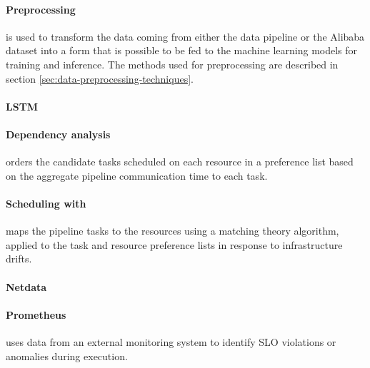       \paragraph{Preprocessing} is used to transform the data coming from either the data pipeline or the Alibaba dataset into a form that is possible to be fed to the machine learning models for training and inference. The methods used for preprocessing are described in section \ref{sec:data-preprocessing-techniques}.

      \paragraph{LSTM}

      \paragraph{Dependency analysis} orders the candidate tasks scheduled on each resource in a preference list based on the aggregate pipeline communication time to each task.
      
      
      \paragraph{Scheduling with \CMATCH } maps the pipeline tasks to the resources using a matching theory algorithm, applied to the task and resource preference lists in response to infrastructure drifts.
    
    
      
      \paragraph{Netdata}

      \paragraph{Prometheus} uses data from an external monitoring system to identify SLO violations or anomalies during execution.



